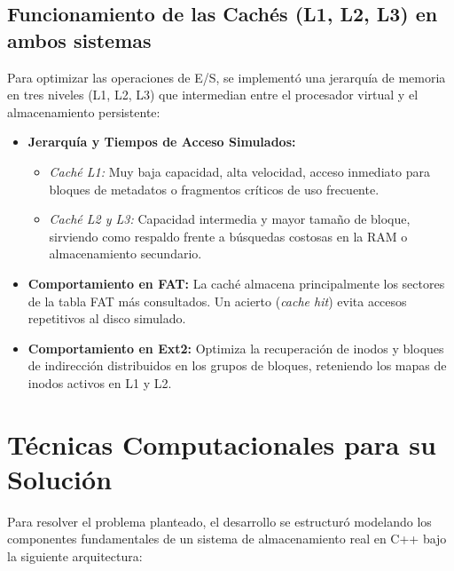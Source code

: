 \documentclass[12pt,a4paper]{article}
\begin{document}
	\subsection{Funcionamiento de las Cachés (L1, L2, L3) en ambos sistemas}
	Para optimizar las operaciones de E/S, se implementó una jerarquía de memoria en tres niveles (L1, L2, L3) que intermedian entre el procesador virtual y el almacenamiento persistente:
	\begin{itemize}
		\item \textbf{Jerarquía y Tiempos de Acceso Simulados:} 
		\begin{itemize}
			\item \textit{Caché L1:} Muy baja capacidad, alta velocidad, acceso inmediato para bloques de metadatos o fragmentos críticos de uso frecuente.
			\item \textit{Caché L2 y L3:} Capacidad intermedia y mayor tamaño de bloque, sirviendo como respaldo frente a búsquedas costosas en la RAM o almacenamiento secundario.
		\end{itemize}
		\item \textbf{Comportamiento en FAT:} La caché almacena principalmente los sectores de la tabla FAT más consultados. Un acierto (\textit{cache hit}) evita accesos repetitivos al disco simulado.
		\item \textbf{Comportamiento en Ext2:} Optimiza la recuperación de inodos y bloques de indirección distribuidos en los grupos de bloques, reteniendo los mapas de inodos activos en L1 y L2.
	\end{itemize}
	
	\section{Técnicas Computacionales para su Solución}
	Para resolver el problema planteado, el desarrollo se estructuró modelando los componentes fundamentales de un sistema de almacenamiento real en C++ bajo la siguiente arquitectura:
	
\end{document}
